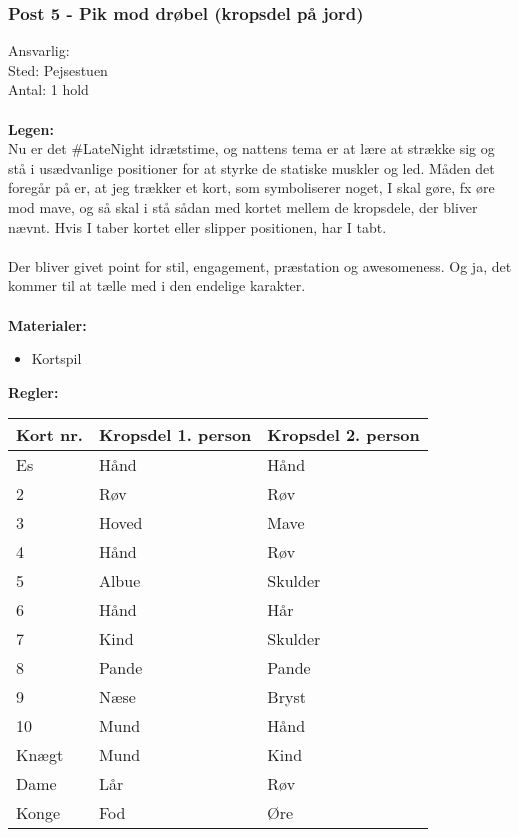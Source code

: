 \subsubsection{Post 5 - Pik mod drøbel (kropsdel på jord)}
Ansvarlig: \KABS \\
Sted: Pejsestuen \\
Antal: 1 hold \\\\
\textbf{Legen:}\\
Nu er det \#LateNight idrætstime, og nattens tema er at lære at strække sig og stå i usædvanlige positioner for at styrke de statiske muskler og led. Måden det foregår på er, at jeg trækker et kort, som symboliserer noget, I skal gøre, fx øre mod mave, og så skal i stå sådan med kortet mellem de kropsdele, der bliver nævnt. Hvis I taber kortet eller slipper positionen, har I tabt.\\\\
Der bliver givet point for stil, engagement, præstation og awesomeness. Og ja, det kommer til at tælle med i den endelige karakter.\\\\
\textbf{Materialer:}
\begin{multicols}{2}
\begin{itemize}
  \item Kortspil
\end{itemize}
\end{multicols}

\textbf{Regler:}\\
\begin{tabular}{ | l | l | l | }
\hline
	Kort nr. & Kropsdel 1. person & Kropsdel 2. person \\ \hline
	Es & Hånd & Hånd \\ \hline
	2 & Røv & Røv \\ \hline
	3 & Hoved & Mave \\ \hline
	4 & Hånd & Røv \\ \hline
	5 & Albue & Skulder \\ \hline
	6 & Hånd & Hår \\ \hline
	7 & Kind & Skulder \\ \hline
	8 & Pande & Pande \\ \hline
	9 & Næse & Bryst \\ \hline
	10 & Mund & Hånd \\ \hline
	Knægt & Mund & Kind \\ \hline
	Dame & Lår & Røv \\ \hline
	Konge & Fod & Øre \\ \hline
\end{tabular}

